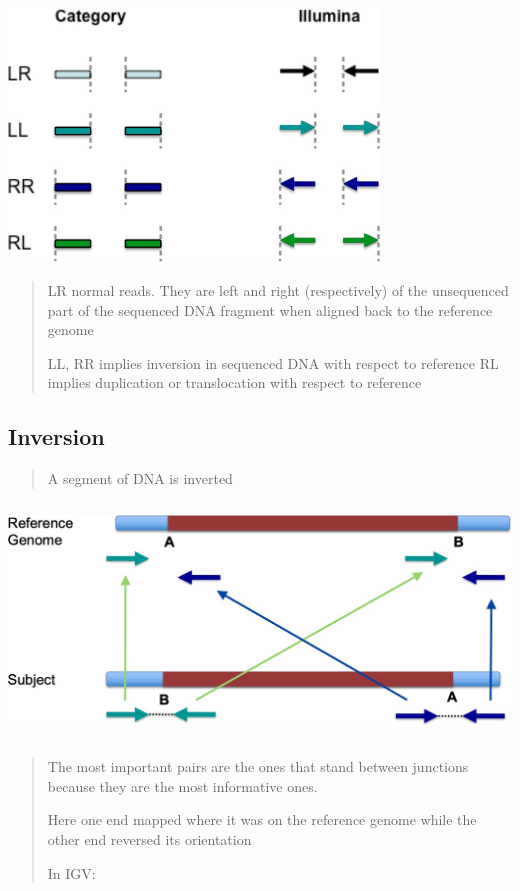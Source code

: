 \includegraphics[width=3.89062in,height=2.65in]{image20.jpeg}

\begin{quote}
LR normal reads. They are left and right (respectively) of the
unsequenced part of the sequenced DNA fragment when aligned back to the
reference genome

LL, RR implies inversion in sequenced DNA with respect to reference RL
implies duplication or translocation with respect to reference
\end{quote}

\hypertarget{inversion}{%
\subsection{Inversion}\label{inversion}}

\begin{quote}
A segment of DNA is inverted
\end{quote}

\includegraphics[width=5.85745in,height=2.45625in]{image21.jpeg}

\begin{quote}
The most important pairs are the ones that stand between junctions
because they are the most informative ones.

Here one end mapped where it was on the reference genome while the other
end reversed its orientation

In IGV:
\end{quote}

